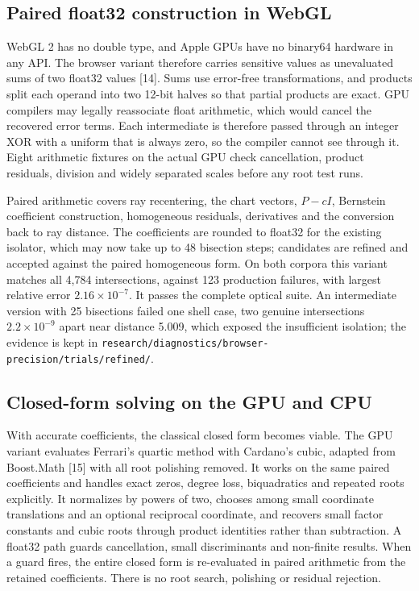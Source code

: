 \documentclass[11pt,a4paper]{article}
\begin{document}
\subsection{Paired float32 construction in
WebGL}\label{paired-float32-construction-in-webgl}

WebGL 2 has no double type, and Apple GPUs have no binary64 hardware in
any API. The browser variant therefore carries sensitive values as
unevaluated sums of two float32 values {[}14{]}. Sums use error-free
transformations, and products split each operand into two 12-bit halves
so that partial products are exact. GPU compilers may legally
reassociate float arithmetic, which would cancel the recovered error
terms. Each intermediate is therefore passed through an integer XOR with
a uniform that is always zero, so the compiler cannot see through it.
Eight arithmetic fixtures on the actual GPU check cancellation, product
residuals, division and widely separated scales before any root test
runs.

Paired arithmetic covers ray recentering, the chart vectors, \(P-cI\),
Bernstein coefficient construction, homogeneous residuals, derivatives
and the conversion back to ray distance. The coefficients are rounded to
float32 for the existing isolator, which may now take up to 48 bisection
steps; candidates are refined and accepted against the paired
homogeneous form. On both corpora this variant matches all 4,784
intersections, against 123 production failures, with largest relative
error \(2.16\times10^{-7}\). It passes the complete optical suite. An
intermediate version with 25 bisections failed one shell case, two
genuine intersections \(2.2\times10^{-9}\) apart near distance 5.009,
which exposed the insufficient isolation; the evidence is kept in
\texttt{research/diagnostics/browser-precision/trials/refined/}.

\subsection{Closed-form solving on the GPU and
CPU}\label{closed-form-solving-on-the-gpu-and-cpu}

With accurate coefficients, the classical closed form becomes viable.
The GPU variant evaluates Ferrari's quartic method with Cardano's cubic,
adapted from Boost.Math {[}15{]} with all root polishing removed. It
works on the same paired coefficients and handles exact zeros, degree
loss, biquadratics and repeated roots explicitly. It normalizes by
powers of two, chooses among small coordinate translations and an
optional reciprocal coordinate, and recovers small factor constants and
cubic roots through product identities rather than subtraction. A
float32 path guards cancellation, small discriminants and non-finite
results. When a guard fires, the entire closed form is re-evaluated in
paired arithmetic from the retained coefficients. There is no root
search, polishing or residual rejection.
\end{document}
